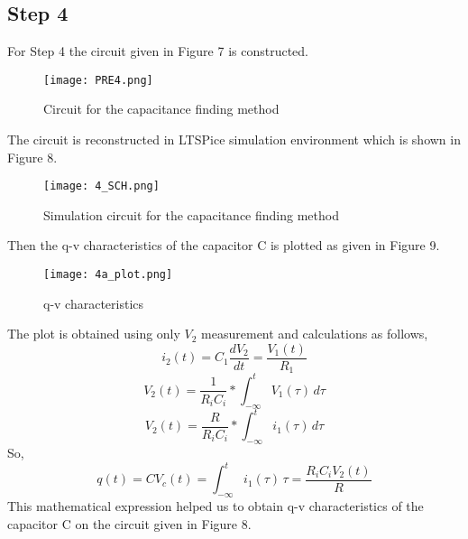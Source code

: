 \documentclass[letterpaper,12pt]{article}
\begin{document}
\subsection{Step 4}
For Step 4 the circuit given  in Figure 7 is constructed. 
\begin{figure}[H]
	\centering
   \texttt{[image: PRE4.png]}
   \caption{Circuit for the capacitance finding method}
\end{figure}
The circuit is reconstructed in LTSPice simulation environment which is shown in Figure 8.
\begin{figure}[H]
	\centering
   \texttt{[image: 4\_SCH.png]}
   \caption{Simulation circuit for the capacitance finding method}
\end{figure}
Then the q-v characteristics of the capacitor C is plotted as given in Figure 9.
\begin{figure}[H]
	\centering
   \texttt{[image: 4a\_plot.png]}
   \caption{q-v characteristics}
\end{figure}
The plot is obtained using only \(V_2\) measurement and calculations as follows,
\[ i_2(t) = C_1 \frac{d V_2}{dt} = \frac{V_1(t)}{R_1}
\]
\[
	V_2(t) = \frac{1}{R_i C_i} * \int_{-\infty}^{t} V_1(\tau) \, d\tau
	\]
	\[
		V_2(t) = \frac{R}{R_i C_i} * \int_{-\infty}^{t} i_1(\tau) \, d\tau
		\]
So, 
\[ q(t) = C V_c(t) = \int_{-\infty}^{t} i_1(\tau) \,\tau = \frac{R_i C_i V_2(t)}{R} \]
This mathematical expression helped us to obtain q-v characteristics of the capacitor C on the circuit given in Figure 8.

\end{document}

